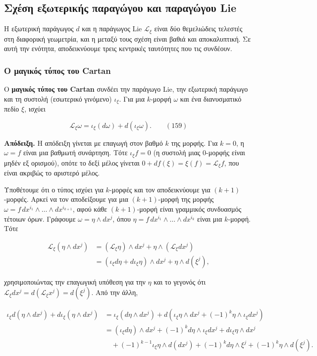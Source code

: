 \documentclass[12pt]{article}
\begin{document}
\subsection{Σχέση εξωτερικής παραγώγου και παραγώγου Lie}

Η εξωτερική παράγωγος $d$ και η παράγωγος Lie $\mathcal{L}_\xi$ είναι δύο θεμελιώδεις τελεστές στη διαφορική γεωμετρία, και η μεταξύ τους σχέση είναι βαθιά και αποκαλυπτική. Σε αυτή την ενότητα, αποδεικνύουμε τρεις κεντρικές ταυτότητες που τις συνδέουν.

\subsubsection{Ο μαγικός τύπος του Cartan}

Ο \textbf{μαγικός τύπος του Cartan} συνδέει την παράγωγο Lie, την εξωτερική παράγωγο και τη συστολή (εσωτερικό γινόμενο) $\iota_\xi$. Για μια $k$-μορφή $\omega$ και ένα διανυσματικό πεδίο $\xi$, ισχύει

\[
\mathcal{L}_\xi \omega = \iota_\xi (d\omega) + d(\iota_\xi \omega). \qquad (159)
\]

\textbf{Απόδειξη.} Η απόδειξη γίνεται με επαγωγή στον βαθμό $k$ της μορφής. Για $k = 0$, η $\omega = f$ είναι μια βαθμωτή συνάρτηση. Τότε $\iota_\xi f = 0$ (η συστολή μιας 0-μορφής είναι μηδέν εξ ορισμού), οπότε το δεξί μέλος γίνεται $0 + df(\xi) = \xi(f) = \mathcal{L}_\xi f$, που είναι ακριβώς το αριστερό μέλος.

Υποθέτουμε ότι ο τύπος ισχύει για $k$-μορφές και τον αποδεικνύουμε για $(k+1)$-μορφές. Αρκεί να τον αποδείξουμε για μια $(k+1)$-μορφή της μορφής $\omega = f \, dx^{i_1} \wedge \dots \wedge dx^{i_{k+1}}$, αφού κάθε $(k+1)$-μορφή είναι γραμμικός συνδυασμός τέτοιων όρων. Γράφουμε $\omega = \eta \wedge dx^j$, όπου $\eta = f \, dx^{i_1} \wedge \dots \wedge dx^{i_k}$ είναι μια $k$-μορφή. Τότε

\[
\begin{aligned}
\mathcal{L}_\xi (\eta \wedge dx^j) &= (\mathcal{L}_\xi \eta) \wedge dx^j + \eta \wedge (\mathcal{L}_\xi dx^j) \\
&= (\iota_\xi d\eta + d\iota_\xi \eta) \wedge dx^j + \eta \wedge d(\xi^j),
\end{aligned}
\]

χρησιμοποιώντας την επαγωγική υπόθεση για την $\eta$ και το γεγονός ότι $\mathcal{L}_\xi dx^j = d(\mathcal{L}_\xi x^j) = d(\xi^j)$. Από την άλλη,

\[
\begin{aligned}
\iota_\xi d(\eta \wedge dx^j) + d\iota_\xi (\eta \wedge dx^j) &= \iota_\xi (d\eta \wedge dx^j) + d(\iota_\xi \eta \wedge dx^j + (-1)^k \eta \wedge \iota_\xi dx^j) \\
&= (\iota_\xi d\eta) \wedge dx^j + (-1)^k d\eta \wedge \iota_\xi dx^j + d\iota_\xi \eta \wedge dx^j \\
&\quad + (-1)^{k-1} \iota_\xi \eta \wedge d(dx^j) + (-1)^k d\eta \wedge \xi^j + (-1)^k \eta \wedge d(\xi^j).
\end{aligned}
\]
\end{document}
